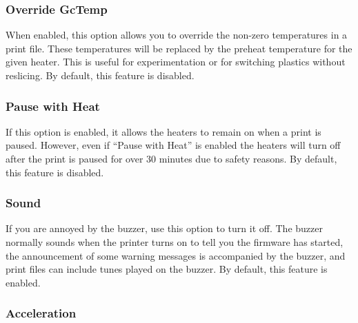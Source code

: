 
\subsubsection{Override GcTemp} \label{sec:override}

When enabled, this option allows you to override the non-zero temperatures in a print file.  These temperatures will be replaced by the preheat temperature for the given heater.  This is useful for experimentation or for switching plastics without reslicing.  By default, this feature is disabled.


\subsubsection{Pause with Heat} \label{sec:pauseheat}

If this option is enabled, it allows the heaters to remain on when a print is paused.  However, even if ``Pause with Heat'' is enabled the heaters will turn off after the print is paused for over 30 minutes due to safety reasons.  By default, this feature is disabled.


\subsubsection{Sound} \label{sec:sound}

If you are annoyed by the buzzer, use this option to turn it off.  The buzzer normally sounds when the printer turns on to tell you the firmware has started, the announcement of some warning messages is accompanied by the buzzer, and print files can include tunes played on the buzzer.  By default, this feature is enabled.


\subsubsection{Acceleration} \label{sec:acceleration-enable}

